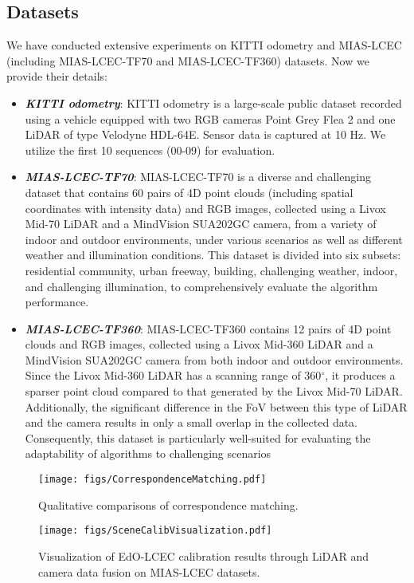 \subsection{Datasets}
We have conducted extensive experiments on KITTI odometry and MIAS-LCEC (including MIAS-LCEC-TF70 and MIAS-LCEC-TF360) datasets. Now we provide their details:
\begin{itemize}
\item {\textbf{\textit{ KITTI odometry}}: KITTI odometry is a large-scale public dataset recorded using a vehicle equipped with two RGB cameras Point Grey Flea 2 and one LiDAR of type Velodyne HDL-64E. Sensor data is captured at 10 Hz. We utilize the first 10 sequences (00-09) for evaluation.}
\item {\textbf{\textit{MIAS-LCEC-TF70}}: MIAS-LCEC-TF70 is a diverse and challenging dataset that contains 60 pairs of 4D point clouds (including spatial coordinates with intensity data) and RGB images, collected using a Livox Mid-70 LiDAR and a MindVision SUA202GC camera, from a variety of indoor and outdoor environments, under various scenarios as well as different weather and illumination conditions. This dataset is divided into six subsets: residential community, urban freeway, building, challenging weather, indoor, and challenging illumination, to comprehensively evaluate the algorithm performance. }
\item {\textbf{\textit{MIAS-LCEC-TF360}}:  MIAS-LCEC-TF360 contains 12 pairs of 4D point clouds and RGB images, collected using a Livox Mid-360 LiDAR and a MindVision SUA202GC camera from both indoor and outdoor environments. Since the Livox Mid-360 LiDAR has a scanning range of 360$^\circ$,  it produces a sparser point cloud compared to that generated by the Livox Mid-70 LiDAR. Additionally, the significant difference in the FoV between this type of LiDAR and the camera results in only a small overlap in the collected data. Consequently, this dataset is particularly well-suited for evaluating the adaptability of algorithms to challenging scenarios }
\end{itemize}

\begin{figure}
    \centering
    \texttt{[image: figs/CorrespondenceMatching.pdf]}
    \caption{Qualitative comparisons of correspondence matching.}
    \label{fig.cmp_matching}
    \vspace{-1em}
\end{figure}

\begin{figure*}[t!]
    \centering
    \texttt{[image: figs/SceneCalibVisualization.pdf]}
    \caption{Visualization of EdO-LCEC calibration results through LiDAR and camera data fusion on MIAS-LCEC datasets.}
    \label{fig.EdO_calib_visualization}
\end{figure*}

